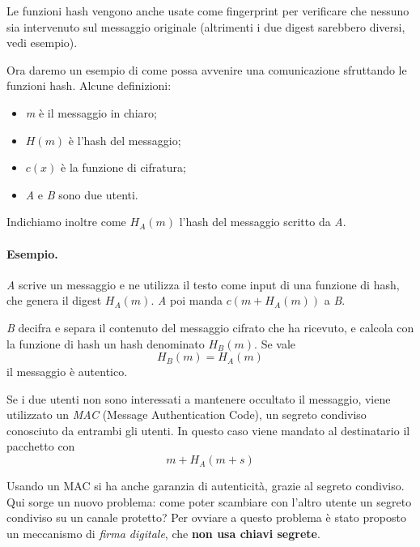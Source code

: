 \documentclass[a4paper, 11pt]{article}
\begin{document}
\begin{multicols}{2}
		Le funzioni hash vengono anche usate come fingerprint per verificare che nessuno sia intervenuto sul messaggio originale (altrimenti i due digest sarebbero diversi, vedi esempio).
		
		Ora daremo un esempio di come possa avvenire una comunicazione sfruttando le funzioni hash.
		Alcune definizioni:
		\begin{itemize}
			\item \textit{m} è il messaggio in chiaro;
			\item $H(m)$ è l'hash del messaggio;
			\item $c(x)$ è la funzione di cifratura;
			\item \textit{A} e \textit{B} sono due utenti.
		\end{itemize}
		Indichiamo inoltre come $H_A(m)$ l'hash del messaggio scritto da \textit{A}.
		
		\paragraph{Esempio.} \textit{A} scrive un messaggio e ne utilizza il testo come input di una funzione di hash, che genera il digest $H_A(m)$. \textit{A} poi manda $c(m + H_A(m))$ a \textit{B}. 
		
		\textit{B} decifra e separa il contenuto del messaggio cifrato che ha ricevuto, e calcola con la funzione di hash un hash denominato $H_B(m)$. Se vale \[ H_B(m) = H_A(m) \] il messaggio è autentico.
		
		Se i due utenti non sono interessati a mantenere occultato il messaggio, viene utilizzato un \textit{MAC} (Message Authentication Code), un segreto condiviso conosciuto da entrambi gli utenti. In questo caso viene mandato al destinatario il pacchetto con \[ m + H_A(m + s) \] 
		
		Usando un MAC si ha anche garanzia di autenticità, grazie al segreto condiviso. Qui sorge un nuovo problema: come poter scambiare con l'altro utente un segreto condiviso su un canale protetto? Per ovviare a questo problema è stato proposto un meccanismo di \textit{firma digitale}, che \textbf{non usa chiavi segrete}.
		
		
		
		
		
		
	
	
	
	
	
	
	
	
	
	
	
	
	
	\end{multicols}
\end{document}
